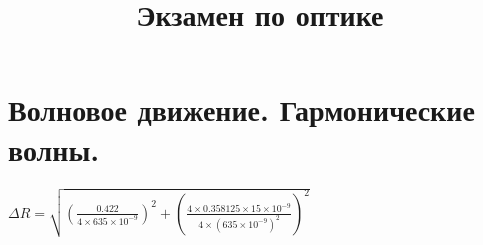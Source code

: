 \documentclass[12pt]{article}
\title{Экзамен по оптике}
\author{}
\date{}
\begin{document}
\maketitle

\section{Волновое движение. Гармонические волны.}

$\Delta R=\sqrt{
	\left(\frac{0.422}{4\times 635\times 10^{-9}}\right)^2
	+\left(\frac{4\times 0.358125\times 15\times 10^{-9}}
	{4\times (635\times 10^{-9})^2}\right)^2}$
\end{document}
